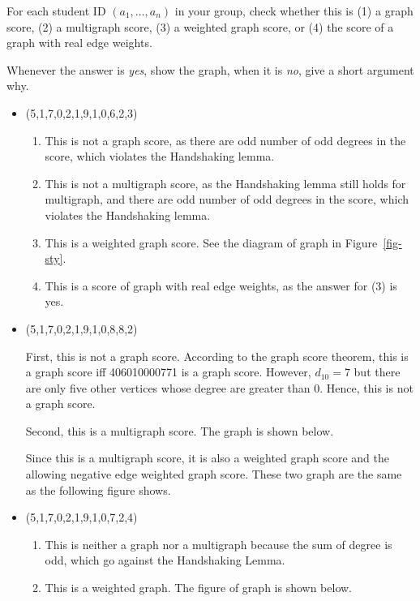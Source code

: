 \documentclass[12pt,a4]{article}
\begin{document}
\begin{exercise}
   For each student ID $(a_1,\dots,a_n)$ in your group, check whether
   this is (1) a graph score, (2) a multigraph score, (3) a weighted graph score, or
   (4) the score of a graph with real edge weights.

   Whenever the answer is {\em yes}, show the graph, when it is {\em no},
   give a short argument why.
   \begin{solution} \quad
  \begin{itemize}
    \item (5,1,7,0,2,1,9,1,0,6,2,3)
    \begin{enumerate}
      \item This is not a graph score, as there are odd number of odd degrees in the score, which violates the Handshaking lemma.
      \item This is not a multigraph score, as the Handshaking lemma still holds for multigraph, and there are odd number of odd degrees in the score, which violates the Handshaking lemma.
      \item This is a weighted graph score. See the diagram of graph in Figure~\ref{fig-sty}.
      \item This is a score of graph with real edge weights, as the answer for (3) is yes.
    \end{enumerate}
    \item (5,1,7,0,2,1,9,1,0,8,8,2)

  First, this is not a graph score. According to the graph score theorem, this is a graph score iff 406010000771 is a graph score. However, $d_10=7$ but there are only five other vertices whose degree are greater than 0. Hence, this is not a graph score.

  Second, this is a multigraph score. The graph is shown below.
  

  Since this is a multigraph score, it is also a weighted graph score and the allowing negative edge weighted graph score. These two graph are the same as the following figure shows.

  

 \item (5,1,7,0,2,1,9,1,0,7,2,4)
 	\begin{enumerate}
 		\item This is neither a graph nor a multigraph because the sum of degree is odd, which go against the Handshaking Lemma.
 		\item This is a weighted graph. The figure of graph is shown below.
 		

\end{enumerate}
\end{itemize}
\end{solution}
\end{exercise}
\end{document}
